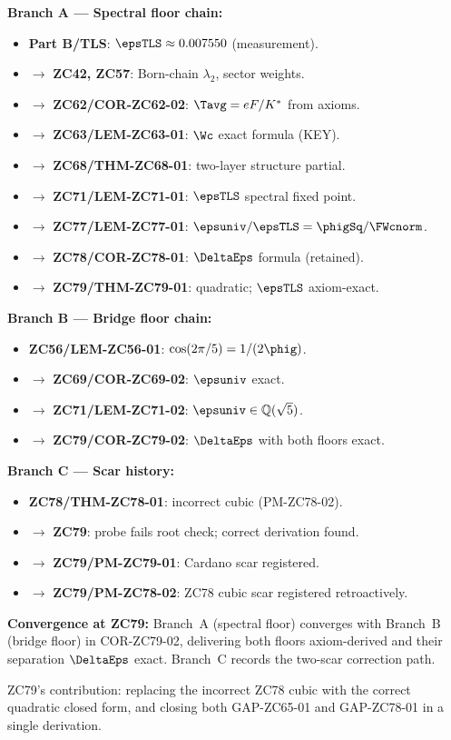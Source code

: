 \documentclass[12pt, a4paper]{article}
\begin{document}
\begin{genealogybox}[title={How ZC79's Key Objects Trace Back}]

\textbf{Branch A --- Spectral floor chain:}
\begin{itemize}[leftmargin=2em, noitemsep]
  \item \textbf{Part B/TLS}: $\epsTLS \approx 0.007550$ (measurement).
  \item $\to$ \textbf{ZC42, ZC57}: Born-chain $\lambda_2$, sector weights.
  \item $\to$ \textbf{ZC62/COR-ZC62-02}: $\Tavg = eF/K^*$ from axioms.
  \item $\to$ \textbf{ZC63/LEM-ZC63-01}: $\Wc$ exact formula (KEY).
  \item $\to$ \textbf{ZC68/THM-ZC68-01}: two-layer structure partial.
  \item $\to$ \textbf{ZC71/LEM-ZC71-01}: $\epsTLS$ spectral fixed point.
  \item $\to$ \textbf{ZC77/LEM-ZC77-01}: $\epsuniv/\epsTLS = \phigSq/\FWcnorm$.
  \item $\to$ \textbf{ZC78/COR-ZC78-01}: $\DeltaEps$ formula (retained).
  \item $\to$ \textbf{ZC79/THM-ZC79-01}: quadratic; $\epsTLS$ axiom-exact.
\end{itemize}

\textbf{Branch B --- Bridge floor chain:}
\begin{itemize}[leftmargin=2em, noitemsep]
  \item \textbf{ZC56/LEM-ZC56-01}: $\cos(2\pi/5) = 1/(2\phig)$.
  \item $\to$ \textbf{ZC69/COR-ZC69-02}: $\epsuniv$ exact.
  \item $\to$ \textbf{ZC71/LEM-ZC71-02}: $\epsuniv \in \mathbb{Q}(\sqrt{5})$.
  \item $\to$ \textbf{ZC79/COR-ZC79-02}: $\DeltaEps$ with both floors exact.
\end{itemize}

\textbf{Branch C --- Scar history:}
\begin{itemize}[leftmargin=2em, noitemsep]
  \item \textbf{ZC78/THM-ZC78-01}: incorrect cubic (PM-ZC78-02).
  \item $\to$ \textbf{ZC79}: probe fails root check; correct derivation found.
  \item $\to$ \textbf{ZC79/PM-ZC79-01}: Cardano scar registered.
  \item $\to$ \textbf{ZC79/PM-ZC78-02}: ZC78 cubic scar registered retroactively.
\end{itemize}

\textbf{Convergence at ZC79:}
Branch~A (spectral floor) converges with Branch~B (bridge floor)
in COR-ZC79-02, delivering both floors axiom-derived and their
separation $\DeltaEps$ exact. Branch~C records the two-scar
correction path.

ZC79's contribution: replacing the incorrect ZC78 cubic with
the correct quadratic closed form, and closing both GAP-ZC65-01
and GAP-ZC78-01 in a single derivation.
\end{genealogybox}
\end{document}
